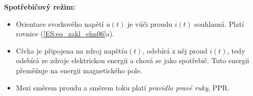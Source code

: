         
        
    \textbf{Spotřebičový režim:}
    \begin{itemize}
      \item Orientace svorkového napětí \(u(t)\) je vůči proudu \(i(t)\) souhlasná. Platí rovnice
            (\ref{ES:eq_zakl_elm06}a).
      \item Cívka je připojena na zdroj napětí\( u(t)\), odebírá z něj proud \(i(t)\), tedy odebírá
            ze zdroje elektrickou energii a chová se jako spotřebič. Tuto energii přeměňuje na
            energii magnetického pole.
      \item Mezi směrem proudu a směrem toku platí \emph{pravidlo pravé ruky}, PPR.           
    \end{itemize}
    

